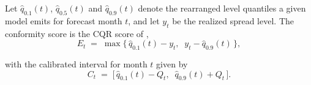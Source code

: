 
Let $\hat q_{0.1}(t)$, $\hat q_{0.5}(t)$ and $\hat q_{0.9}(t)$ denote the
rearranged level quantiles a given model emits for forecast month $t$, and let
$y_t$ be the realized spread level. The conformity score is the CQR score of
\textcite{romano2019cqr},
\begin{equation}
  E_t \;=\; \max\!\big\{\, \hat q_{0.1}(t) - y_t,\;\; y_t - \hat q_{0.9}(t) \,\big\},
  \label{eq:cqr-score}
\end{equation}


with the calibrated interval for month $t$ given by
\begin{equation}
  C_t \;=\; \big[\, \hat q_{0.1}(t) - Q_t,\;\; \hat q_{0.9}(t) + Q_t \,\big].
  \label{eq:cqr-interval}
\end{equation}


